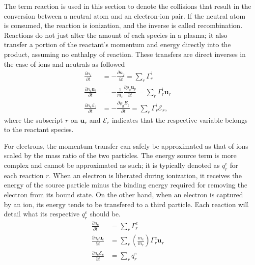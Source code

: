 The term reaction is used in this section to denote the collisions that result in the conversion between a neutral atom and an electron-ion pair. If the neutral atom is consumed, the reaction is ionization, and the
inverse is called recombination. Reactions do not just alter the amount of each species in a plasma; it also transfer a portion of the reactant's momentum and energy directly into the product, assuming no enthalpy of
reaction. These transfers are direct inverses in the case of ions and neutrals as followed
\begin{subequations}
    \begin{align}
        \frac{\partial n_i}{\partial t} &= -\frac{\partial n_g}{\partial t} = \sum_r \Gamma_r^i \\
        \frac{\partial n_i \mathbf{u}_i}{\partial t} &= -\frac{1}{m_i} \frac{\partial \rho_g \mathbf{u}_g}{\partial t} = \sum_r \Gamma_r^i \mathbf{u}_r \\
        \frac{\partial n_i \mathcal{E}_i}{\partial t} &= -\frac{\partial \rho_g E_g}{\partial t} = \sum_r \Gamma_r^i \mathcal{E}_r,
    \end{align}
\end{subequations}
where the subscript $r$ on $\mathbf{u}_r$ and $\mathcal{E}_r$ indicates that the respective variable belongs to the reactant species.

For electrons, the momentum transfer can safely be approximated as that of ions scaled by the mass ratio of the two particles. The energy source term is more complex and cannot be approximated as such; it is typically
denoted as $q^e_r$ for each reaction $r$. When an electron is liberated during ionization, it receives the energy of the source particle minus the binding energy required for removing the electron from its bound state.
On the other hand, when an electron is captured by an ion, its energy tends to be transfered to a third particle. Each reaction will detail what its respective $q^e_r$ should be.
\begin{subequations}
    \begin{align}
        \frac{\partial n_e}{\partial t} &= \sum_r \Gamma_r^e \\
        \frac{\partial n_e \mathbf{u}_e}{\partial t} &= \sum_r \left(\frac{m_e}{m_r} \right) \Gamma_r^e \mathbf{u}_r \\
        \frac{\partial n_e \mathcal{E}_e}{\partial t} &= \sum_r q^e_r
    \end{align}
\end{subequations}


